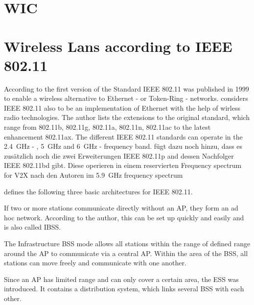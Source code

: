 \documentclass[]{nsm-thesis}
\begin{document}
\section{\acl{WIC}}





\section{Wireless Lans according to IEEE 802.11}
According to \textcite{kauffels_wireless_2002} the first version of the Standard IEEE 802.11 was published in 1999 to enable a wireless alternative to Ethernet - or Token-Ring - networks.
\textcite{sauter_wireless_2022} considers IEEE 802.11 also to be an implementation of Ethernet with the help of wirless radio technologies. The author lists the extensions to the original standard, which range from 802.11b, 802.11g, 802.11a, 802.11n, 802.11ac to the latest enhancement 802.11ax. The different IEEE 802.11 standards can operate in the  \SI{2.4}{\giga\hertz} - , \SI{5}{\giga\hertz} and \SI{6}{\giga\hertz} - frequency band. 
\textcite{jacob_system-level_2020} fügt dazu noch hinzu, dass es zusätzlich noch die zwei Erweiterungen IEEE 802.11p and dessen Nachfolger IEEE 802.11bd gibt. Diese operieren in einem reservierten Frequency spectrum for \ac{V2X} nach den Autoren im  \SI{5.9}{\giga\hertz} frequency spectrum

\textcite{kauffels_wireless_2002} defines the following three basic architectures for IEEE 802.11.

If two or more stations communicate directly without an AP, they form an ad hoc network. According to the author, this can be set up quickly and easily and is also called \ac{IBSS}.

The Infrastructure \ac{BSS} mode allows all stations within the range of defined range around the \ac{AP} to communicate via a central \ac{AP}. Within the area of the \ac{BSS}, all stations can move freely and communicate with one another.

Since an \ac{AP} has limited range and can only cover a certain area, the \ac{ESS} was introduced. It contains a distribution system, which links several \ac{BSS} with each other.
\end{document}
